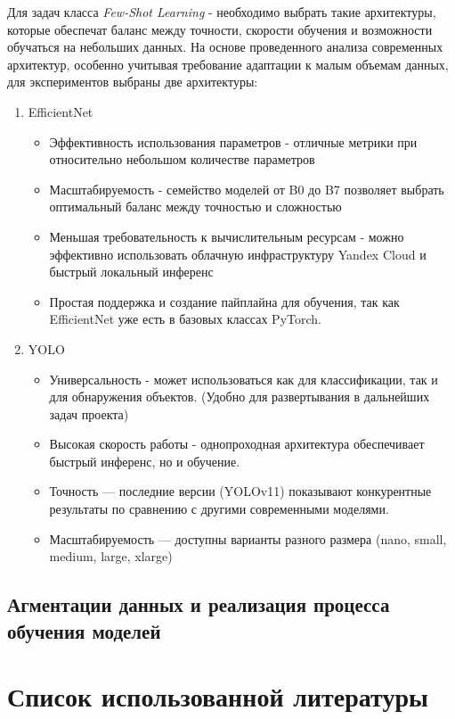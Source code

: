 \documentclass[14pt]{extarticle}
\begin{document}
\hspace{1cm}
Для задач класса \textit{Few-Shot Learning} - необходимо выбрать такие архитектуры, которые обеспечат баланс между точности, скорости обучения и возможности обучаться на небольших данных. На основе проведенного анализа современных архитектур, особенно учитывая требование адаптации к малым объемам данных, для экспериментов выбраны две архитектуры:
\begin{enumerate}
\item EfficientNet

\begin{itemize}[leftmargin=-0.5cm]
    \item Эффективность использования параметров - отличные метрики при относительно небольшом количестве параметров
    \item Масштабируемость - семейство моделей от B0 до B7 позволяет выбрать оптимальный баланс между точностью и сложностью
    \item Меньшая требовательность к вычислительным ресурсам - можно эффективно использовать облачную инфраструктуру Yandex Cloud и быстрый локальный инференс
    \item Простая поддержка и создание пайплайна для обучения, так как EfficientNet уже есть в базовых классах PyTorch.
\end{itemize}
\item YOLO
\begin{itemize}[leftmargin=-0.5cm]
    \item Универсальность - может использоваться как для классификации, так и для обнаружения объектов. (Удобно для развертывания в дальнейших задач проекта)
    \item Высокая скорость работы - однопроходная архитектура обеспечивает быстрый инференс, но и обучение. 
    \item Точность --- последние версии (YOLOv11) показывают конкурентные результаты по сравнению с другими современными моделями.
    \item Масштабируемость --- доступны варианты разного размера (nano, small, medium, large, xlarge)
\end{itemize}
\end{enumerate}

\subsection{Агментации данных и реализация процесса обучения моделей}
\section*{Список использованной литературы}
\printbibliography[heading=none]
\end{document}
